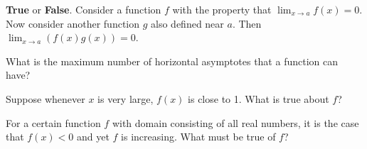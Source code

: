 \documentclass{ximera}
\newcommand{\recommendation}[1]{}
\newcommand{\GoodQuestions}[1]{}
\begin{document}
\begin{problem}
  \recommendation{Vic}
  \GoodQuestions{Subject: Limits 16Q}
  \textbf{True} or \textbf{False}.  Consider a function $f$ with
  the property that $\lim_{x\to a} f(x) =0$.  Now consider another
  function $g$ also defined near $a$.  Then $\lim_{x\to a}
  \left(f(x)g(x)\right) = 0$.
  \begin{multipleChoice}
  \end{multipleChoice}
\end{problem}







\begin{problem}
  \recommendation{Vic}
  \GoodQuestions{Subject: Limits 19Q}
  What is the maximum number of horizontal asymptotes that a function
  can have?
  \begin{multipleChoice}
  \end{multipleChoice}
\end{problem}


\begin{problem}
  Suppose whenever $x$ is very large, $f(x)$ is close to 1.  What is true about $f$?
  \begin{multipleChoice}
  \end{multipleChoice}
\end{problem}

\begin{problem}
  For a certain function $f$ with domain consisting of all real
  numbers, it is the case that $f(x) < 0$ and yet $f$ is increasing.
  What must be true of $f$?
  \begin{multipleChoice}
  \end{multipleChoice}
\end{problem}
\end{document}

